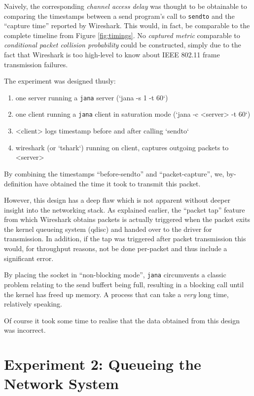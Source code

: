 Naively, the corresponding \emph{channel access delay} was thought to be
obtainable to comparing the timestamps between a send program's call to
\texttt{sendto} and the ``capture time'' reported by Wireshark. This would, in
fact, be comparable to the complete timeline from Figure \ref{fig:timings}. No
\emph{captured metric} comparable to \emph{conditional packet collision
probability} could be constructed, simply due to the fact that Wireshark is
too high-level to know about IEEE 802.11 frame transmission failures.

The experiment was designed thusly:

\begin{enumerate}
	\item one server running a \texttt{jana} server (`jana -s 1 -t 60`)
	\item one client running a \texttt{jana} client in saturation mode (`jana -c <server> -t 60`)
	\item <client> logs timestamp before and after calling `sendto`
	\item wireshark (or `tshark`) running on client, captures outgoing packets to <server>
\end{enumerate}

By combining the timestamps ``before-sendto'' and ``packet-capture'', we,
by-definition have obtained the time it took to transmit this packet.

However, this design has a deep flaw which is not apparent without deeper
insight into the networking stack. As explained earlier, the ``packet tap''
feature from which Wireshark obtains packets is actually triggered when the
packet exits the kernel queueing system (qdisc) and handed over to the driver
for transmission. In addition, if the tap was triggered after packet
transmission this would, for throughput reasons, not be done per-packet and
thus include a significant error.

By placing the socket in ``non-blocking mode'', \texttt{jana} circumvents a
classic problem relating to the send buffert being full, resulting in a
blocking call until the kernel has freed up memory. A process that can take a
\emph{very} long time, relatively speaking.

Of course it took some time to realise that the data obtained from this design
was incorrect.

\section{Experiment 2: Queueing the Network System}

